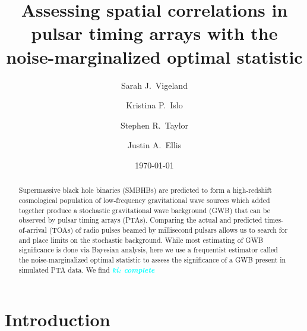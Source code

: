 \documentclass[twocolumn,aps,prd,superscriptaddress]{revtex4-1}
\newcommand{\ki}[1]{\textcolor{cyan}{\it{\textbf{ki: #1}}} }
\begin{document}
\title{Assessing spatial correlations in pulsar timing arrays with the noise-marginalized optimal statistic}


\author{Sarah J.\ Vigeland}

\author{Kristina P.\ Islo}

\author{Stephen R.\ Taylor}

\author{Justin A.\ Ellis}

\date{\today}  

\begin{abstract}
Supermassive black hole binaries (SMBHBs) are predicted to form a 
high-redshift cosmological population of low-frequency gravitational wave sources 
which added together produce a stochastic gravitational wave background (GWB) 
that can be observed by pulsar timing arrays (PTAs). 
Comparing the actual and predicted times-of-arrival (TOAs) of radio pulses beamed by 
millisecond pulsars allows us to search for and place limits on the stochastic background. 
While most estimating of GWB significance is done via Bayesian analysis, 
here we use a frequentist estimator called the noise-marginalized optimal statistic 
to assess the significance of a GWB present in simulated PTA data. We find \ki{complete}

\end{abstract}

\maketitle


\section{Introduction}
\end{document}
